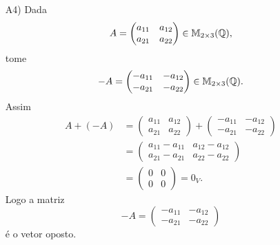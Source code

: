 \documentclass[12pt]{exam}
\begin{document}
\begin{itemize}
        \item[A4)] Dada
        \[
        A = \begin{pmatrix} a_{11} & a_{12}\\a_{21} & a_{22}\end{pmatrix} \in \mathbb{M}_{2 \times 3}(\mathbb{Q}),
        \]
        tome
        \[
        -A = \begin{pmatrix} -a_{11} & -a_{12}\\-a_{21} & -a_{22}\end{pmatrix} \in \mathbb{M}_{2 \times 3}(\mathbb{Q}).
        \]
        Assim
        \begin{align*}
            A + (-A) & = \begin{pmatrix} a_{11} & a_{12}\\a_{21} & a_{22}\end{pmatrix} +
            \begin{pmatrix} -a_{11} & -a_{12}\\-a_{21} & -a_{22}\end{pmatrix}
            \\ &= \begin{pmatrix} a_{11} - a_{11} & a_{12} - a_{12}\\a_{21} - a_{21} & a_{22} - a_{22}\end{pmatrix}
            \\ &= \begin{pmatrix}0 & 0\\0 & 0\end{pmatrix} = 0_V.
        \end{align*}
        Logo a matriz
        \[
        -A = \begin{pmatrix} -a_{11} & -a_{12}\\-a_{21} & -a_{22}\end{pmatrix}
        \]
        é o vetor oposto.


\end{itemize}
\end{document}
